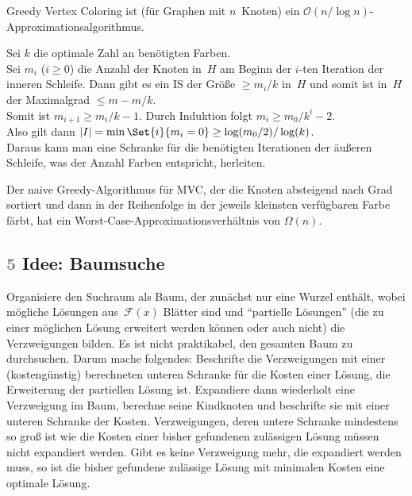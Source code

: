 \documentclass{cheat-sheet}
\newcommand{\Feasible}{\mathcal{F}} %
\renewcommand{\O}{\mathcal{O}} %
\newcommand{\scriptSection}[1]{\textcolor{gray}{#1}\enspace}
\begin{document}
\begin{satz}
  Greedy Vertex Coloring ist (für Graphen mit $n$~Knoten) ein $\O(n / \log n)$-Approximationsalgorithmus.
\end{satz}

\begin{beweisskizze}
  Sei $k$ die optimale Zahl an benötigten Farben. \\
  Sei $m_i$ ($i \geq 0$) die Anzahl der Knoten in~$H$ am Beginn der $i$-ten Iteration der inneren Schleife.
  Dann gibt es ein IS der Größe $\geq m_i/k$ in~$H$ und somit ist in~$H$ der Maximalgrad $\leq m - m/k$. \\
  Somit ist $m_{i+1} \geq m_i/k - 1$.
  Durch Induktion folgt $m_i \geq m_0/k^i - 2$. \\
  Also gilt dann $\abs{I} = \min \Set{i}{m_i = 0} \geq \log(m_0/2) / \log(k)$. \\
  Daraus kann man eine Schranke für die benötigten Iterationen der äußeren Schleife, was der Anzahl Farben entspricht, herleiten.
\end{beweisskizze}

\begin{bem}
  Der naive Greedy-Algorithmus für MVC, der die Knoten absteigend nach Grad sortiert und dann in der Reihenfolge in der jeweils kleinsten verfügbaren Farbe färbt, hat ein Worst-Case-Approximationsverhältnis von $\Omega(n)$.
\end{bem}

\subsection{\scriptSection{5} Idee: Baumsuche}



\begin{strategie}
  Organisiere den Suchraum als Baum, der zunächst nur eine Wurzel enthält, wobei mögliche Lösungen aus~$\Feasible(x)$ Blätter sind und "`partielle Lösungen"' (die zu einer möglichen Lösung erweitert werden können oder auch nicht) die Verzweigungen bilden.
  Es ist nicht praktikabel, den gesamten Baum zu durchsuchen.
  Darum mache folgendes:
  Beschrifte die Verzweigungen mit einer (kostengünstig) berechneten unteren Schranke für die Kosten einer Lösung, die Erweiterung der partiellen Lösung ist.
  Expandiere dann wiederholt eine Verzweigung im Baum, \dh{} berechne seine Kindknoten und beschrifte sie mit einer unteren Schranke der Kosten.
  Verzweigungen, deren untere Schranke mindestens so groß ist wie die Kosten einer bisher gefundenen zulässigen Lösung müssen nicht expandiert werden.
  Gibt es keine Verzweigung mehr, die expandiert werden muss, so ist die bisher gefundene zulässige Lösung mit minimalen Kosten eine optimale Lösung.
\end{strategie}
\end{document}
